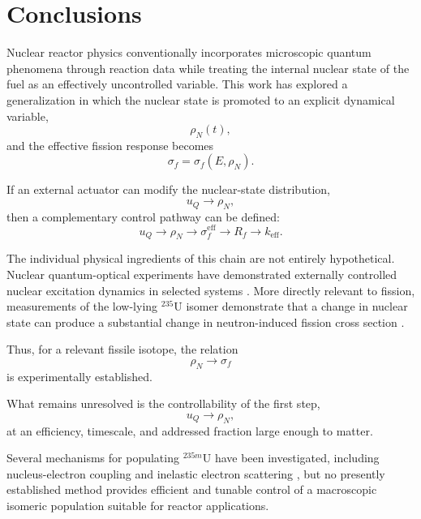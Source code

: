 \section{Conclusions}
\label{sec:conclusions}

Nuclear reactor physics conventionally incorporates microscopic quantum phenomena through reaction data while treating the internal nuclear state of the fuel as an effectively uncontrolled variable. This work has explored a generalization in which the nuclear state is promoted to an explicit dynamical variable,
\begin{equation}
\rho_N(t),
\end{equation}
and the effective fission response becomes
\begin{equation}
\sigma_f
=
\sigma_f(E,\rho_N).
\end{equation}

If an external actuator can modify the nuclear-state distribution,
\begin{equation}
u_Q
\rightarrow
\rho_N,
\end{equation}
then a complementary control pathway can be defined:
\begin{equation}
u_Q
\rightarrow
\rho_N
\rightarrow
\sigma_f^{\mathrm{eff}}
\rightarrow
R_f
\rightarrow
k_{\mathrm{eff}}.
\end{equation}

The individual physical ingredients of this chain are not entirely hypothetical. Nuclear quantum-optical experiments have demonstrated externally controlled nuclear excitation dynamics in selected systems \cite{Heeg2021,Yamaguchi2024}. More directly relevant to fission, measurements of the low-lying $^{235}$U isomer demonstrate that a change in nuclear state can produce a substantial change in neutron-induced fission cross section \cite{DEer1988}.

Thus, for a relevant fissile isotope, the relation
\begin{equation}
\rho_N
\rightarrow
\sigma_f
\end{equation}
is experimentally established.

What remains unresolved is the controllability of the first step,
\begin{equation}
u_Q
\rightarrow
\rho_N,
\end{equation}
at an efficiency, timescale, and addressed fraction large enough to matter.

Several mechanisms for populating $^{235m}$U have been investigated, including nucleus-electron coupling and inelastic electron scattering \cite{Chodash2016,LiuWang2022}, but no presently established method provides efficient and tunable control of a macroscopic isomeric population suitable for reactor applications.

